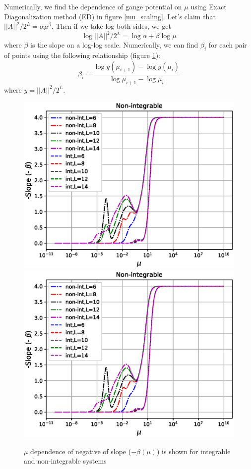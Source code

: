 \documentclass[11pt,a4paper]{article}
\begin{document}
Numerically, we find the dependence of gauge potential on $\mu$ using Exact Diagonalization method (ED) in figure \ref{mu_scaling}. Let's claim that $||A||^2/2^L=\alpha\mu^{\beta}$. Then if we take log both sides, we get
\begin{equation}
\log ||A||^2/2^L=\log \alpha+ \beta \log \mu
\end{equation}
where $\beta$ is the slope on a log-log scale. Numerically, we can find $\beta_i$ for each pair of points using the following relationship (figure \ref{slope_nonintegrable_mu}):
\begin{equation}
\beta_i=\dfrac{\log y( \mu_{i+1}) -\log y( \mu_{i})} {\log \mu_{i+1}-\log \mu_{i}}
\end{equation}
where $y= ||A||^2/2^L$. 
\begin{figure}[!ht]
\begin{center}
\includegraphics[scale=0.7]{new_pics/v3_slope_nonint_int_compare_semilogx.eps}\\
\includegraphics[scale=0.7]{new_pics/v3_slope_nonint_int_compare_semilogx.eps}
\caption{$\mu$ dependence of negative of slope ($-\beta (\mu)$) is shown for  integrable and non-integrable systems }
\label{slope_nonintegrable_mu}
\end{center}
\end{figure}
\end{document}
